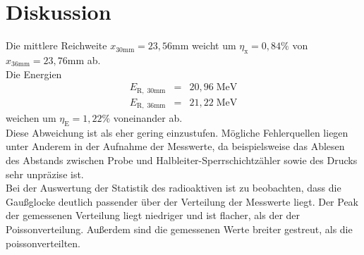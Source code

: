 \section{Diskussion}
\label{sec:Diskussion}


Die mittlere Reichweite $x_{\mathrm{30mm}} = 23,56 \mathrm{mm}$ weicht um 
$\eta_{\mathrm{x}} = 0,84 \%$ von $x_{\mathrm{36mm}} = 23,76 \mathrm{mm}$ ab.\\

Die Energien
\begin{eqnarray}
    E_{\mathrm{R, \; 30mm}} &=& 20,96 \; \mathrm{MeV}  \nonumber \\
    E_{\mathrm{R, \; 36mm}} &=& 21,22 \; \mathrm{MeV}  \nonumber
\end{eqnarray}
weichen um $\eta_{\mathrm{E}} = 1,22 \%$ voneinander ab.\\
Diese Abweichung ist als eher gering einzustufen.
Mögliche Fehlerquellen liegen unter Anderem in der Aufnahme der Messwerte, 
da beispielsweise das Ablesen des Abstands zwischen Probe und Halbleiter-Sperrschichtzähler sowie des Drucks sehr unpräzise ist.\\
Bei der Auswertung der Statistik des radioaktiven ist zu beobachten, dass die 
Gaußglocke deutlich passender über der Verteilung der Messwerte liegt. 
Der Peak der gemessenen Verteilung liegt niedriger und ist flacher, als der der Poissonverteilung.
Außerdem sind die gemessenen Werte breiter gestreut, als die poissonverteilten.\\